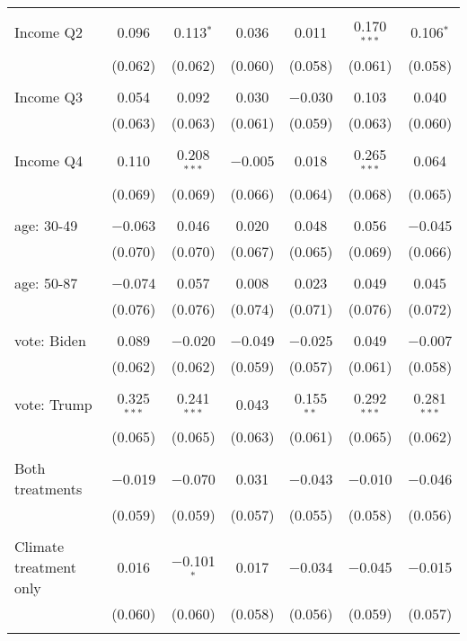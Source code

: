 \begin{tabular}{@{\extracolsep{5pt}}lcccccc}
  & & & & & & \\ 
 Income Q2 & 0.096 & 0.113$^{*}$ & 0.036 & 0.011 & 0.170$^{***}$ & 0.106$^{*}$ \\ 
  & (0.062) & (0.062) & (0.060) & (0.058) & (0.061) & (0.058) \\ 
  & & & & & & \\ 
 Income Q3 & 0.054 & 0.092 & 0.030 & $-$0.030 & 0.103 & 0.040 \\ 
  & (0.063) & (0.063) & (0.061) & (0.059) & (0.063) & (0.060) \\ 
  & & & & & & \\ 
 Income Q4 & 0.110 & 0.208$^{***}$ & $-$0.005 & 0.018 & 0.265$^{***}$ & 0.064 \\ 
  & (0.069) & (0.069) & (0.066) & (0.064) & (0.068) & (0.065) \\ 
  & & & & & & \\ 
 age: 30-49 & $-$0.063 & 0.046 & 0.020 & 0.048 & 0.056 & $-$0.045 \\ 
  & (0.070) & (0.070) & (0.067) & (0.065) & (0.069) & (0.066) \\ 
  & & & & & & \\ 
 age: 50-87 & $-$0.074 & 0.057 & 0.008 & 0.023 & 0.049 & 0.045 \\ 
  & (0.076) & (0.076) & (0.074) & (0.071) & (0.076) & (0.072) \\ 
  & & & & & & \\ 
 vote: Biden & 0.089 & $-$0.020 & $-$0.049 & $-$0.025 & 0.049 & $-$0.007 \\ 
  & (0.062) & (0.062) & (0.059) & (0.057) & (0.061) & (0.058) \\ 
  & & & & & & \\ 
 vote: Trump & 0.325$^{***}$ & 0.241$^{***}$ & 0.043 & 0.155$^{**}$ & 0.292$^{***}$ & 0.281$^{***}$ \\ 
  & (0.065) & (0.065) & (0.063) & (0.061) & (0.065) & (0.062) \\ 
  & & & & & & \\ 
 Both treatments & $-$0.019 & $-$0.070 & 0.031 & $-$0.043 & $-$0.010 & $-$0.046 \\ 
  & (0.059) & (0.059) & (0.057) & (0.055) & (0.058) & (0.056) \\ 
  & & & & & & \\ 
 Climate treatment only & 0.016 & $-$0.101$^{*}$ & 0.017 & $-$0.034 & $-$0.045 & $-$0.015 \\ 
  & (0.060) & (0.060) & (0.058) & (0.056) & (0.059) & (0.057) \\ 
  & & & & & & \\ 

\end{tabular}
